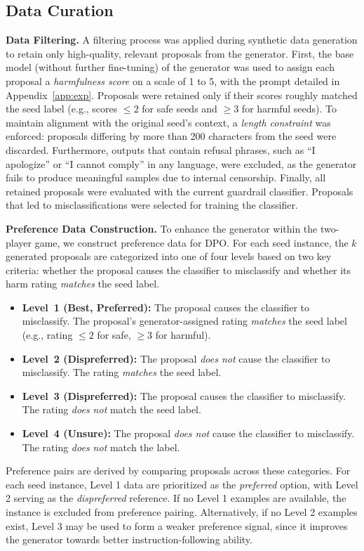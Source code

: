 \subsection{Data Curation}
\textbf{Data Filtering.}
A filtering process was applied during synthetic data generation to retain only high-quality, relevant proposals from the generator. First, the base model (without further fine-tuning) of the generator 
was used to assign each proposal a \textit{harmfulness score} on a scale of 1 to 5, with the prompt detailed in Appendix~\ref{app:exp}. Proposals were retained only if their scores roughly matched the seed label (e.g., scores $\leq 2$ for safe seeds and $\geq 3$ for harmful seeds). To maintain alignment with the original seed’s context, a \textit{length constraint} was enforced: proposals differing by more than 200 characters from the seed were discarded.  Furthermore, outputs that contain refusal phrases, such as ``I apologize'' or ``I cannot comply'' in any language, were excluded, as the generator fails to produce meaningful samples due to internal censorship. Finally, all retained proposals were evaluated with the current guardrail classifier. Proposals that led to misclassifications were selected for training the classifier. 


\textbf{Preference Data Construction.}
To enhance the generator within the two-player game, we construct preference data for DPO. For each seed instance, the $k$ generated proposals are categorized into one of four levels based on two key criteria: whether the proposal causes the classifier to misclassify and whether its harm rating \textit{matches} the seed label. 

\begin{itemize}[nosep,leftmargin=*]
    \item \textbf{Level~1 (Best, Preferred):} The proposal causes the classifier to misclassify. The proposal's generator-assigned rating \textit{matches} the seed label (e.g., rating $\leq 2$ for safe, $\geq 3$ for harmful).
    
    \item \textbf{Level~2 (Dispreferred):} The proposal \textit{does not} cause the classifier to misclassify. The rating \textit{matches} the seed label.
    
    \item \textbf{Level~3 (Dispreferred):} The proposal causes the classifier to misclassify. The rating \textit{does not} match the seed label. 
    
    \item \textbf{Level~4 (Unsure):} The proposal \textit{does not} cause the classifier to misclassify. The rating \textit{does not} match the label.
\end{itemize}
Preference pairs are derived by comparing proposals across these categories. For each seed instance, Level 1 data are prioritized as the \textit{preferred} option, with Level 2 serving as the \textit{dispreferred} reference. If no Level 1 examples are available, the instance is excluded from preference pairing. Alternatively, if no Level 2 examples exist, Level 3 may be used to form a weaker preference signal, since it improves the generator towards better instruction-following ability.
